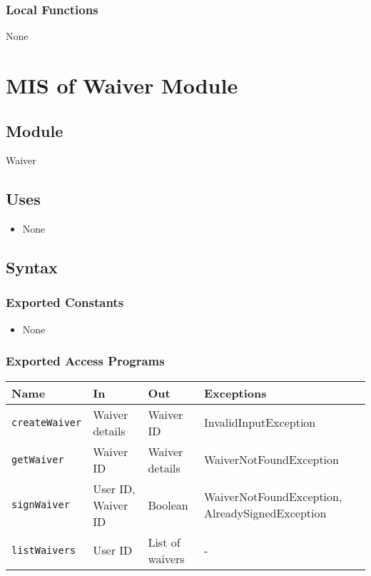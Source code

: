 \documentclass[12pt, titlepage]{article}
\begin{document}
\begin{itemize}
\subsubsection{Local Functions}
None

\section{MIS of Waiver Module} \label{WaiverModule}

\subsection{Module}
Waiver

\subsection{Uses}

\begin{itemize}
    \item None
\end{itemize}

\subsection{Syntax}

\subsubsection{Exported Constants}
\begin{itemize}
    \item None
\end{itemize}

\subsubsection{Exported Access Programs}
\begin{center}
\begin{tabular}{|p{3cm}|p{4cm}|p{4cm}|p{4cm}|}
\hline
\textbf{Name} & \textbf{In} & \textbf{Out} & \textbf{Exceptions} \\
\hline
\texttt{createWaiver} & Waiver details & Waiver ID & InvalidInputException \\
\texttt{getWaiver} & Waiver ID & Waiver details & WaiverNotFoundException \\
\texttt{signWaiver} & User ID, Waiver ID & Boolean & WaiverNotFoundException, AlreadySignedException \\
\texttt{listWaivers} & User ID & List of waivers & - \\


\end{tabular}
\end{center}
\end{itemize}
\end{document}
